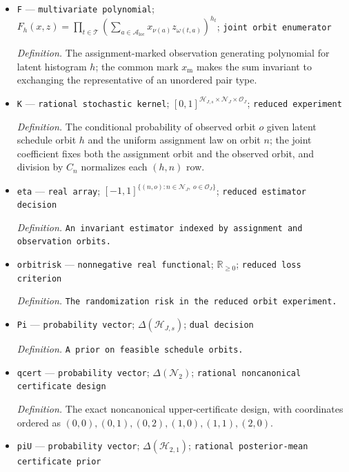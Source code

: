 \documentclass{article}
\begin{document}
\begin{itemize}
  \par\smallskip\noindent\emph{Definition.} The SATE determined explicitly by the latent unordered pair-type histogram \(h\).
  \item \texttt{F} --- \texttt{multivariate polynomial}; \(F_h(x,z)=\prod_{t\in\mathcal T}\left(\sum_{a\in\mathcal A_{\mathrm{loc}}}x_{\nu(a)}z_{\omega(t,a)}\right)^{h_t}\); \texttt{joint orbit enumerator}
  \par\smallskip\noindent\emph{Definition.} The assignment-marked observation generating polynomial for latent histogram \(h\); the common mark \(x_{\mathrm m}\) makes the sum invariant to exchanging the representative of an unordered pair type.
  \item \texttt{K} --- \texttt{rational stochastic kernel}; \([0,1]^{\mathcal H_{J,s}\times\mathcal N_J\times\mathcal O_J}\); \texttt{reduced experiment}
  \par\smallskip\noindent\emph{Definition.} The conditional probability of observed orbit \(o\) given latent schedule orbit \(h\) and the uniform assignment law on orbit \(n\); the joint coefficient fixes both the assignment orbit and the observed orbit, and division by \(C_n\) normalizes each \((h,n)\) row.
  \item \texttt{eta} --- \texttt{real array}; \([-1,1]^{\{(n,o):n\in\mathcal N_J,\ o\in\mathcal O_J\}}\); \texttt{reduced estimator decision}
  \par\smallskip\noindent\emph{Definition.} \texttt{An invariant estimator indexed by assignment and observation orbits.}
  \item \texttt{orbitrisk} --- \texttt{nonnegative real functional}; \(\mathbb R_{\ge0}\); \texttt{reduced loss criterion}
  \par\smallskip\noindent\emph{Definition.} \texttt{The randomization risk in the reduced orbit experiment.}
  \item \texttt{Pi} --- \texttt{probability vector}; \(\Delta(\mathcal H_{J,s})\); \texttt{dual decision}
  \par\smallskip\noindent\emph{Definition.} \texttt{A prior on feasible schedule orbits.}
  \item \texttt{qcert} --- \texttt{probability vector}; \(\Delta(\mathcal N_2)\); \texttt{rational noncanonical certificate design}
  \par\smallskip\noindent\emph{Definition.} The exact noncanonical upper-certificate design, with coordinates ordered as \((0,0),(0,1),(0,2),(1,0),(1,1),(2,0)\).
  \item \texttt{piU} --- \texttt{probability vector}; \(\Delta(\mathcal H_{2,1})\); \texttt{rational posterior-\allowbreak{}mean certificate prior}

\end{itemize}
\end{document}
